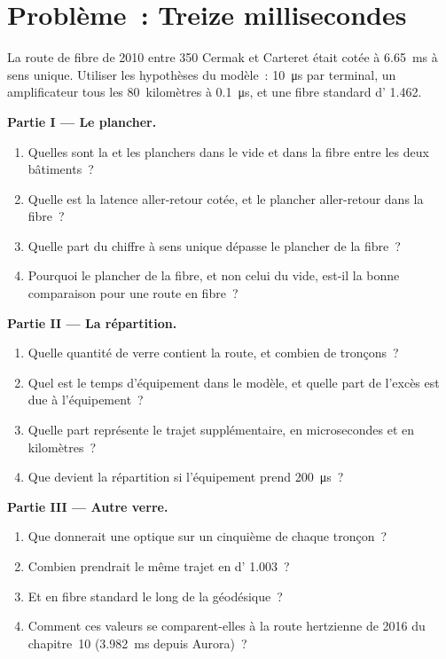 \section{Problème~: Treize millisecondes}

\begin{problem}\label{pb:nw:long-haul-fibre:1}
La route de fibre de 2010 entre 350 Cermak et Carteret était cotée à \qty{6.65}{\milli\second} à sens unique. Utiliser les hypothèses du modèle~: \qty{10}{\micro\second}
par terminal, un amplificateur tous les 80~kilomètres à \qty{0.1}{\micro\second}, et une fibre standard d' 1.462.

\medskip\noindent\textbf{Partie I --- Le plancher.}
\begin{enumerate}
\item Quelles sont la  et les planchers dans le vide et dans la fibre entre les deux bâtiments~?
\item Quelle est la latence aller-retour cotée, et le plancher aller-retour dans la fibre~?
\item Quelle part du chiffre à sens unique dépasse le plancher de la fibre~?
\item Pourquoi le plancher de la fibre, et non celui du vide, est-il la bonne comparaison pour une route en fibre~?
\end{enumerate}

\medskip\noindent\textbf{Partie II --- La répartition.}
\begin{enumerate}[resume]
\item Quelle quantité de verre contient la route, et combien de tronçons~?
\item Quel est le temps d'équipement dans le modèle, et quelle part de l'excès est due à l'équipement~?
\item Quelle part représente le trajet supplémentaire, en microsecondes et en kilomètres~?
\item Que devient la répartition si l'équipement prend \qty{200}{\micro\second}~?
\end{enumerate}

\medskip\noindent\textbf{Partie III --- Autre verre.}
\begin{enumerate}[resume]
\item Que donnerait une  optique sur un cinquième de chaque tronçon~?
\item Combien prendrait le même trajet en  d' 1.003~?
\item Et en fibre standard le long de la géodésique~?
\item Comment ces valeurs se comparent-elles à la route hertzienne de 2016 du chapitre~10 (\qty{3.982}{\milli\second} depuis Aurora)~?
\end{enumerate}


\end{problem}

